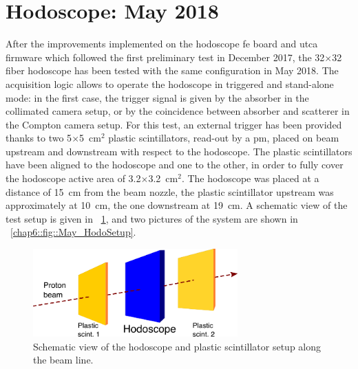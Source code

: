 \section{Hodoscope: May 2018}\label{chap6::sec::may2018}
After the improvements implemented on the hodoscope \gls{fe} board and \gls{utca} firmware which followed the first preliminary test in December 2017, the 32$\times$32 fiber hodoscope has been tested with the same configuration in May 2018. The acquisition logic allows to operate the hodoscope in triggered and stand-alone mode: in the first case, the trigger signal is given by the absorber in the collimated camera setup, or by the coincidence between absorber and scatterer in the Compton camera setup. For this test, an external trigger has been provided thanks to two 5$\times$5~cm$^2$ plastic scintillators, read-out by a \gls{pm}, placed on beam upstream and downstream with respect to the hodoscope. The plastic scintillators have been aligned to the hodoscope and one to the other, in order to fully cover the hodoscope active area of 3.2$\times$3.2~cm$^2$. The hodoscope was placed at a distance of 15~cm from the beam nozzle, the plastic scintillator upstream was approximately at 10~cm, the one downstream at 19~cm. A schematic view of the test setup is given in \figurename~\ref{chap6::fig::May_HodoDAQscheme}, and two pictures of the system are shown in \figurename~\ref{chap6::fig::May_HodoSetup}. 


\begin{figure}[!htbp]
\centering
\includegraphics[width=0.7\textwidth]{03_GraphicFiles/chapter6_BeamTests/Nice_May2018/scheme.png}
\caption{Schematic view of the hodoscope and plastic scintillator setup along the beam line.}
\label{chap6::fig::May_HodoDAQscheme}
\end{figure}

